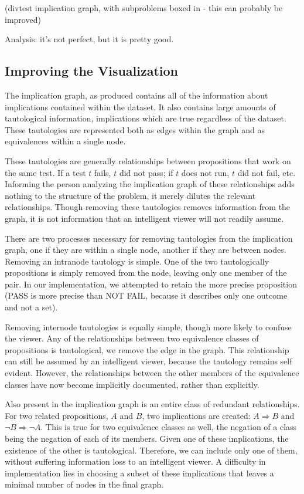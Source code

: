 \documentclass[11pt]{article}
\begin{document}
(divtest implication graph, with subproblems boxed in - this can probably be improved)


Analysis: it's not perfect, but it is pretty good.
\subsection{Improving the Visualization}
The implication graph, as produced contains all of the information about implications contained within the dataset. It also contains large amounts of tautological information, implications which are true regardless of the dataset. These tautologies are represented both as edges within the graph and as equivalences within a single node.

These tautologies are generally relationships between propositions that work on the same test. If a test $t$ fails, $t$ did not pass; if $t$ does not run, $t$ did not fail, etc. Informing the person analyzing the implication graph of these relationships adds nothing to the structure of the problem, it merely dilutes the relevant relationships. Though removing these tautologies removes information from the graph, it is not information that an intelligent viewer will not readily assume.

There are two processes necessary for removing tautologies from the implication graph, one if they are within a single node, another if they are between nodes. Removing an intranode tautology is simple. One of the two tautologically propositions is simply removed from the node, leaving only one member of the pair. In our implementation, we attempted to retain the more precise proposition (PASS is more precise than NOT FAIL, because it describes only one outcome and not a set). 

Removing internode tautologies is equally simple, though more likely to confuse the viewer. Any of the relationships between two equivalence classes of propositions is tautological, we remove the edge in the graph. This relationship can still be assumed by an intelligent viewer, because the tautology remains self evident. However, the relationships between the other members of the equivalence classes have now become implicitly documented, rather than explicitly.

Also present in the implication graph is an entire class of redundant relationships. For two related propositions, $A$ and $B$, two implications are created: $A \Rightarrow B$ and $\neg B \Rightarrow \neg A$. This is true for two equivalence classes as well, the negation of a class being the negation of each of its members. Given one of these implications, the existence of the other is tautological. Therefore, we can include only one of them, without suffering information loss to an intelligent viewer. A difficulty in implementation lies in choosing a subset of these implications that leaves a minimal number of nodes in the final graph.
\end{document}

